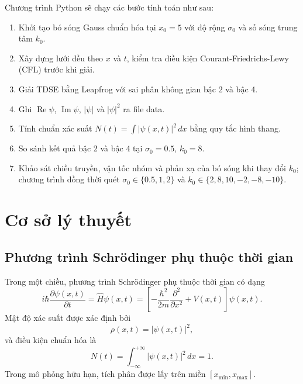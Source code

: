 \documentclass[12pt,a4paper]{article}
\begin{document}
Chương trình Python sẽ chạy các bước tính toán như sau:
\begin{enumerate}
    \item Khởi tạo bó sóng Gauss chuẩn hóa tại $x_0=5$ với độ rộng $\sigma_0$ và số sóng trung tâm $k_0$.
    \item Xây dựng lưới đều theo $x$ và $t$, kiểm tra điều kiện Courant-Friedrichs-Lewy (CFL) trước khi giải.
    \item Giải TDSE bằng Leapfrog với sai phân không gian bậc 2 và bậc 4.
    \item Ghi $\operatorname{Re}\psi$, $\operatorname{Im}\psi$, $|\psi|$ và $|\psi|^2$ ra file data.
    \item Tính chuẩn xác suất $N(t)=\int |\psi(x,t)|^2\,dx$ bằng quy tắc hình thang.
    \item So sánh kết quả bậc 2 và bậc 4 tại $\sigma_0=0.5$, $k_0=8$.
    \item Khảo sát chiều truyền, vận tốc nhóm và phản xạ của bó sóng khi thay đổi $k_0$; chương trình đồng thời quét $\sigma_0\in\{0.5,1,2\}$ và $k_0\in\{2,8,10,-2,-8,-10\}$.
\end{enumerate}

\section{Cơ sở lý thuyết}

\subsection{Phương trình Schrödinger phụ thuộc thời gian}

Trong một chiều, phương trình Schrödinger phụ thuộc thời gian có dạng
\begin{equation}
    i\hbar\frac{\partial \psi(x,t)}{\partial t}
    = \hat H\psi(x,t)
    = \left[-\frac{\hbar^2}{2m}\frac{\partial^2}{\partial x^2}+V(x,t)\right]\psi(x,t).
    \label{eq:tdse}
\end{equation}
Mật độ xác suất được xác định bởi
\begin{equation}
    \rho(x,t)=|\psi(x,t)|^2,
\end{equation}
và điều kiện chuẩn hóa là
\begin{equation}
    N(t)=\int_{-\infty}^{+\infty}|\psi(x,t)|^2\,dx=1.
    \label{eq:norm}
\end{equation}
Trong mô phỏng hữu hạn, tích phân được lấy trên miền $[x_{\min},x_{\max}]$.
\end{document}
